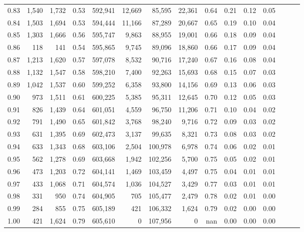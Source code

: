 \begin{tabular}{rrrrrrrrrrrrrrr}
0.83 &   1,540 &  1,732 &  0.53 &  592,941 &   12,669 &   85,595 &   22,361 &  0.64 &  0.21 &  0.12 &      0.05 \\
0.84 &   1,503 &  1,694 &  0.53 &  594,444 &   11,166 &   87,289 &   20,667 &  0.65 &  0.19 &  0.10 &      0.04 \\
0.85 &   1,303 &  1,666 &  0.56 &  595,747 &    9,863 &   88,955 &   19,001 &  0.66 &  0.18 &  0.09 &      0.04 \\
0.86 &     118 &    141 &  0.54 &  595,865 &    9,745 &   89,096 &   18,860 &  0.66 &  0.17 &  0.09 &      0.04 \\
0.87 &   1,213 &  1,620 &  0.57 &  597,078 &    8,532 &   90,716 &   17,240 &  0.67 &  0.16 &  0.08 &      0.04 \\
0.88 &   1,132 &  1,547 &  0.58 &  598,210 &    7,400 &   92,263 &   15,693 &  0.68 &  0.15 &  0.07 &      0.03 \\
0.89 &   1,042 &  1,537 &  0.60 &  599,252 &    6,358 &   93,800 &   14,156 &  0.69 &  0.13 &  0.06 &      0.03 \\
0.90 &     973 &  1,511 &  0.61 &  600,225 &    5,385 &   95,311 &   12,645 &  0.70 &  0.12 &  0.05 &      0.03 \\
0.91 &     826 &  1,439 &  0.64 &  601,051 &    4,559 &   96,750 &   11,206 &  0.71 &  0.10 &  0.04 &      0.02 \\
0.92 &     791 &  1,490 &  0.65 &  601,842 &    3,768 &   98,240 &    9,716 &  0.72 &  0.09 &  0.03 &      0.02 \\
0.93 &     631 &  1,395 &  0.69 &  602,473 &    3,137 &   99,635 &    8,321 &  0.73 &  0.08 &  0.03 &      0.02 \\
0.94 &     633 &  1,343 &  0.68 &  603,106 &    2,504 &  100,978 &    6,978 &  0.74 &  0.06 &  0.02 &      0.01 \\
0.95 &     562 &  1,278 &  0.69 &  603,668 &    1,942 &  102,256 &    5,700 &  0.75 &  0.05 &  0.02 &      0.01 \\
0.96 &     473 &  1,203 &  0.72 &  604,141 &    1,469 &  103,459 &    4,497 &  0.75 &  0.04 &  0.01 &      0.01 \\
0.97 &     433 &  1,068 &  0.71 &  604,574 &    1,036 &  104,527 &    3,429 &  0.77 &  0.03 &  0.01 &      0.01 \\
0.98 &     331 &    950 &  0.74 &  604,905 &      705 &  105,477 &    2,479 &  0.78 &  0.02 &  0.01 &      0.00 \\
0.99 &     284 &    855 &  0.75 &  605,189 &      421 &  106,332 &    1,624 &  0.79 &  0.02 &  0.00 &      0.00 \\
1.00 &     421 &  1,624 &  0.79 &  605,610 &        0 &  107,956 &        0 &   nan &  0.00 &  0.00 &      0.00 \\
\bottomrule
\end{tabular}
